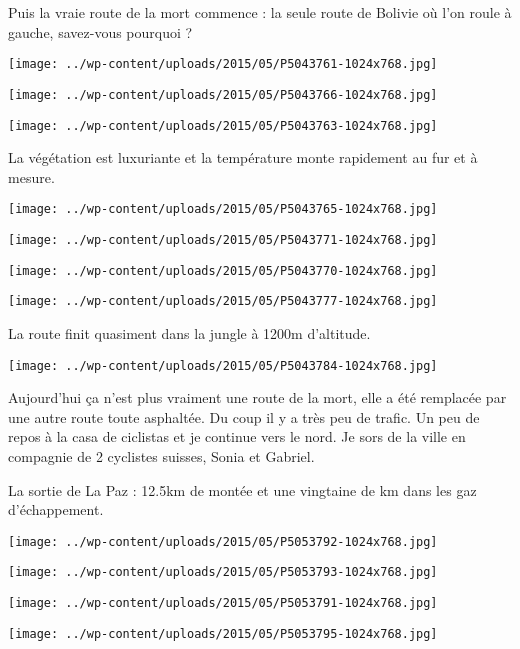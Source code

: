 Puis la vraie route de la mort commence : la seule route de Bolivie où l'on roule à gauche, savez-vous pourquoi ? 
\begin{center} \texttt{[image: ../wp-content/uploads/2015/05/P5043761-1024x768.jpg]} \end{center}

\begin{center} \texttt{[image: ../wp-content/uploads/2015/05/P5043766-1024x768.jpg]} \end{center}
\begin{center} \texttt{[image: ../wp-content/uploads/2015/05/P5043763-1024x768.jpg]} \end{center}
\pagebreak

La végétation est luxuriante et la température monte rapidement au fur et à mesure. 
\begin{center} \texttt{[image: ../wp-content/uploads/2015/05/P5043765-1024x768.jpg]} \end{center}
\begin{center} \texttt{[image: ../wp-content/uploads/2015/05/P5043771-1024x768.jpg]} \end{center}

\begin{center} \texttt{[image: ../wp-content/uploads/2015/05/P5043770-1024x768.jpg]} \end{center}
\begin{center} \texttt{[image: ../wp-content/uploads/2015/05/P5043777-1024x768.jpg]} \end{center}
\pagebreak

La route finit quasiment dans la jungle à 1200m d'altitude. 
\begin{center} \texttt{[image: ../wp-content/uploads/2015/05/P5043784-1024x768.jpg]} \end{center}

Aujourd'hui ça n'est plus vraiment une route de la mort, elle a été remplacée par une autre route toute asphaltée. Du coup il y a très peu de trafic. Un peu de repos à la casa de ciclistas et je continue vers le nord. Je sors de la ville en compagnie de 2 cyclistes suisses, Sonia et Gabriel.

La sortie de La Paz : 12.5km de montée et une vingtaine de km dans les gaz d'échappement. 
\begin{center} \texttt{[image: ../wp-content/uploads/2015/05/P5053792-1024x768.jpg]} \end{center}

\begin{center} \texttt{[image: ../wp-content/uploads/2015/05/P5053793-1024x768.jpg]} \end{center}
\begin{center} \texttt{[image: ../wp-content/uploads/2015/05/P5053791-1024x768.jpg]} \end{center}

\begin{center} \texttt{[image: ../wp-content/uploads/2015/05/P5053795-1024x768.jpg]} \end{center}
